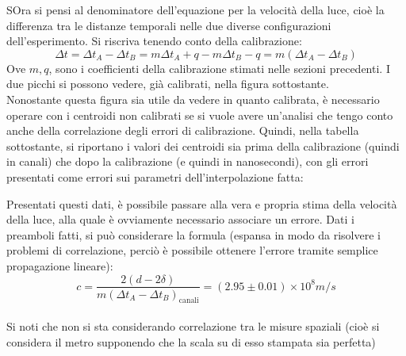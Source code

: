 SOra si pensi al denominatore dell'equazione per la velocità della luce, cioè la differenza tra le distanze temporali nelle due diverse configurazioni dell'esperimento.
Si riscriva tenendo conto della calibrazione:
$$
  \Delta t = \Delta t_A - \Delta t_B = m\Delta t_A + q - m\Delta t_B - q = m (\Delta t_A - \Delta t_B) 
$$
Ove $m,q$, sono i coefficienti della calibrazione stimati nelle sezioni precedenti. I due picchi si possono vedere, già calibrati, nella figura sottostante.\\

Nonostante questa figura sia utile da vedere in quanto calibrata, è necessario operare con i centroidi non calibrati se si vuole avere un'analisi che tengo conto anche
della correlazione degli errori di calibrazione. Quindi, nella tabella sottostante, si riportano i valori dei centroidi sia prima della calibrazione (quindi in canali)
che dopo la calibrazione (e quindi in nanosecondi), con gli errori presentati come errori sui parametri dell'interpolazione fatta:



Presentati questi dati, è possibile passare alla vera e propria stima della velocità della luce, alla quale è ovviamente necessario associare un errore. Dati i preamboli
fatti, si può considerare la formula (espansa in modo da risolvere i problemi di correlazione, perciò è possibile ottenere l'errore tramite semplice propagazione
lineare):
$$
  c = \frac{2 ( d - 2 \delta)}{m (\Delta t_A - \Delta t_B)_\text{canali}} = (2.95 \pm 0.01) \times 10^8 m/s 
$$
\\

Si noti che non si sta considerando correlazione tra le misure spaziali (cioè si considera il metro supponendo che la scala su di esso stampata sia perfetta)

